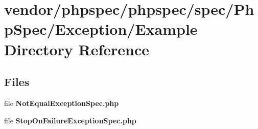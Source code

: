 \section{vendor/phpspec/phpspec/spec/\+Php\+Spec/\+Exception/\+Example Directory Reference}
\label{dir_d1fa723c385f6aa9e05e896f2b98c0c8}
\subsection*{Files}
\begin{DoxyCompactItemize}
\item 
file {\bf Not\+Equal\+Exception\+Spec.\+php}
\item 
file {\bf Stop\+On\+Failure\+Exception\+Spec.\+php}
\end{DoxyCompactItemize}

